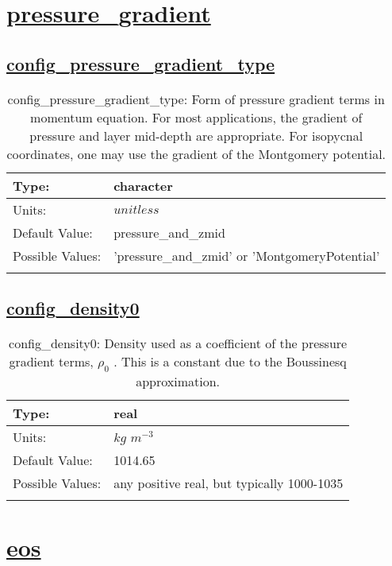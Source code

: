 \section[pressure\_gradient]{\hyperref[sec:nm_tab_pressure_gradient]{pressure\_gradient}}
\label{sec:nm_sec_pressure_gradient}
\subsection[config\_pressure\_gradient\_type]{\hyperref[sec:nm_tab_pressure_gradient]{config\_pressure\_gradient\_type}}
\label{subsec:nm_sec_config_pressure_gradient_type}
\begin{center}
\begin{longtable}{| p{2.0in} | p{4.0in} |}
    \hline
    Type: & character \\
    \hline
    Units: & $unitless$ \\
    \hline
    Default Value: & pressure\_and\_zmid \\
    \hline
    Possible Values: & 'pressure\_and\_zmid' or 'MontgomeryPotential' \\
    \hline
    \caption{config\_pressure\_gradient\_type: Form of pressure gradient terms in momentum equation. For most applications, the gradient of pressure and layer mid-depth are appropriate.  For isopycnal coordinates, one may use the gradient of the Montgomery potential.}
\end{longtable}
\end{center}
\subsection[config\_density0]{\hyperref[sec:nm_tab_pressure_gradient]{config\_density0}}
\label{subsec:nm_sec_config_density0}
\begin{center}
\begin{longtable}{| p{2.0in} | p{4.0in} |}
    \hline
    Type: & real \\
    \hline
    Units: & $kg$ $m^{-3}$ \\
    \hline
    Default Value: & 1014.65 \\
    \hline
    Possible Values: & any positive real, but typically 1000-1035 \\
    \hline
    \caption{config\_density0:  Density used as a coefficient of the pressure gradient terms,  $\rho_0$ .  This is a constant due to the Boussinesq approximation.}
\end{longtable}
\end{center}
\section[eos]{\hyperref[sec:nm_tab_eos]{eos}}
\label{sec:nm_sec_eos}
